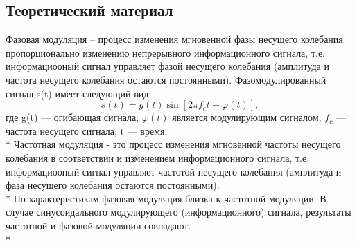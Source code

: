 \documentclass[10pt,a4paper]{article}
\begin{document}
\subsection{Теоретический материал}
Фазовая модуляция – процесс изменения мгновенной фазы несущего колебания пропорционально изменению непрерывного информационного сигнала, т.е. информациооный сигнал управляет фазой несущего колебания (амплитуда и частота несущего колебания остаются постоянными). Фазомодулированный сигнал s(t) имеет следующий вид:
	\begin{equation}
	s(t) = g(t) \sin[2 \pi f_c t + \varphi(t)],
	\end{equation}
где g(t) — огибающая сигнала; $\varphi(t)$ является модулирующим сигналом; $f_c$ — частота несущего сигнала; t — время. \\*
Частотная модуляция - это процесс изменения мгновенной частоты несущего колебания в соответствии и изменением информационного сигнала, т.е. информациооный сигнал управляет частотой несущего колебания (амплитуда и фаза несущего колебания остаются постоянными). \\*
По характеристикам фазовая модуляция близка к частотной модуляции. В случае синусоидального модулирующего (информационного) сигнала, результаты частотной и фазовой модуляции совпадают.\\*
\end{document}
